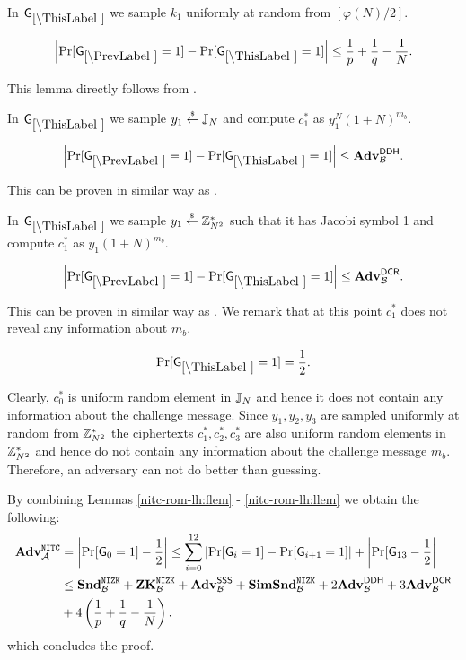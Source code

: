 In $\games_\thisgame$ we sample $k_1$ uniformly at random from $[\varphi(N)/2]$. 

\begin{lemma}
\[
\left|\Pr[\games_\prevgame = 1] - \Pr[\games_\thisgame = 1]\right| \leq \frac{1}{p}+\frac{1}{q}-\frac{1}{N}.
\]
\end{lemma}

This lemma directly follows from .

In $\games_\thisgame$ we sample $y_1 \stackrel{{\scriptscriptstyle\$}}{\leftarrow} \mathbb{J}_N$ and compute $c_1^*$ as  $y_1^{N} (1+N)^{m_b}$. 

\begin{lemma}
\[
\left|\Pr[\games_\prevgame = 1] - \Pr[\games_\thisgame = 1]\right| \leq \advtg_\advB^\ddh.
\]
\end{lemma}
This can be proven in similar way as .

In $\games_\thisgame$ we sample $y_1 \stackrel{{\scriptscriptstyle\$}}{\leftarrow} \mathbb{Z}_{N^2}^*$ such that it has Jacobi symbol 1 and compute $c_1^*$ as $y_1(1+N)^{m_b}$. 

\begin{lemma}
\[
\left|\Pr[\games_\prevgame = 1] - \Pr[\games_\thisgame = 1]\right| \leq \advtg_\advB^\dcr.
\]
\end{lemma}
This can be proven in similar way as . We remark that at this point $c_1^*$ does not reveal any information about $m_b$.

\begin{lemma}\label{nitc-rom-lh:llem}
\[
\Pr[\games_\thisgame = 1] = \half.
\]
\end{lemma}

Clearly, $c_0^*$ is uniform random element in $\mathbb{J}_N$ and hence it does not contain any information about the challenge message. Since $y_1, y_2, y_3$ are sampled uniformly at random from $\mathbb{Z}_{N^2}^*$ the ciphertexts $c_1^*, c_2^*, c_3^*$ are also uniform random elements in $\mathbb{Z}_{N^2}^*$ and hence do not contain any information about the challenge message $m_b$. Therefore, an adversary can not do better than guessing.

By combining Lemmas \ref{nitc-rom-lh:flem} - \ref{nitc-rom-lh:llem} we obtain the following:
\begin{align*}
\mathbf{Adv}^{\mathtt{NITC}}_{\mathcal{A}} &= \left| \Pr[\mathsf{G}_0 = 1] - \frac{1}{2} \right| \leq \sum_{i=0}^{12} \left|\Pr[\mathsf{G}_i = 1] - \Pr[\mathsf{G}_{i+1} = 1] \right| + \left|\Pr[\mathsf{G}_{13}- \frac{1}{2}\right| \\
 &\leq  \mathbf{Snd}^{\mathtt{NIZK}}_{\mathcal{B}} + \mathbf{ZK}^{\mathtt{NIZK}}_{\mathcal{B}} + \mathbf{Adv}^{\mathsf{SSS}}_{\mathcal{B}} + \mathbf{SimSnd}^{\mathtt{NIZK}}_{\mathcal{B}} + 2 \mathbf{Adv}^{\mathsf{DDH}}_{\mathcal{B}} + 3 \mathbf{Adv}^{\mathsf{DCR}}_{\mathcal{B}} \\ &+ 4 \left( \frac{1}{p}+\frac{1}{q}-\frac{1}{N} \right).
\end{align*}
which concludes the proof.


